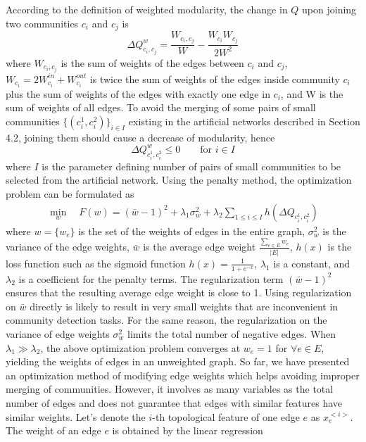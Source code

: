 According to the definition of weighted modularity, the change in $Q$ upon joining two communities $c_i$ and $c_j$ is
\begin{equation} \label{eq:delta_Q}
\Delta Q^w_{c_i, c_j} = \frac{W_{c_i,c_j}}{W} - \frac{W_{c_i} W_{c_j}}{2W^2}
\end{equation}
where $W_{c_i,c_j}$ is the sum of weights of the edges between $c_i$ and $c_j$, $W_{c_i} = 2W_{c_i}^{in}+W_{c_i}^{out}$ is twice the sum of weights of the edges inside community $c_i$ plus the sum of weights of the edges with exactly one edge in $c_i$, and W is the sum of weights of all edges.
To avoid the merging of some pairs of small communities $\{(c_i^1, c_i^2)\}_{i\in I}$ existing in the artificial networks
described in Section 4.2, joining them should cause a decrease of modularity, hence
\begin{equation} \label{eq:avoid}
     \Delta Q^w_{c_i^1, c_i^2} \leq 0 \hspace{2em} \text{for $i \in I$}
\end{equation}
where $I$ is the parameter defining number of pairs of small communities to be selected from the artificial network.
Using the penalty method, the optimization problem can be formulated as
\begin{align} \label{eq:opt_w}
\min_{w}  \hspace{1em} F(w) = ( \bar w - 1)^2 + \lambda_1 \sigma_w^2 + \lambda_2 \sum_{ 1 \leq i \leq I} h( \Delta Q_{c_i^1, c_i^2} )
\end{align}
where $w = \{w_e\}$ is the set of the weights of edges in the entire graph, $\sigma_w^2$ is the variance of the edge weights, $\bar w$ is the average edge weight $\frac{\sum_{e \in E} {w_e}}{|E|}$, $h(x)$ is the loss function such as the sigmoid function $h(x) = \frac{1}{1 + e^{-x}}$, $\lambda_1$ is a constant, and $\lambda_2$ is a coefficient for the penalty terms. 
The regularization term $(\bar w - 1)^2 $ ensures that the resulting average edge weight is close to 1. Using regularization on $\bar w$ directly is likely to result in very small weights that are inconvenient in community detection tasks. For the same reason, the regularization on the variance of edge weights $\sigma_w^2$ limits the total number of negative edges. When $\lambda_1 \gg \lambda_2$, the above optimization problem converges at $w_e = 1$ for $\forall e \in E$, yielding the weights of edges in an unweighted graph.
So far, we have presented an optimization method of modifying edge weights which helps avoiding improper merging of communities. However, it involves as many variables as the total number of edges and does not guarantee that edges with similar features have similar weights. Let's denote the $i$-th topological feature of one edge $e$ as $x_e^{<i>}$. The weight of an edge $e$ is obtained by the linear regression
